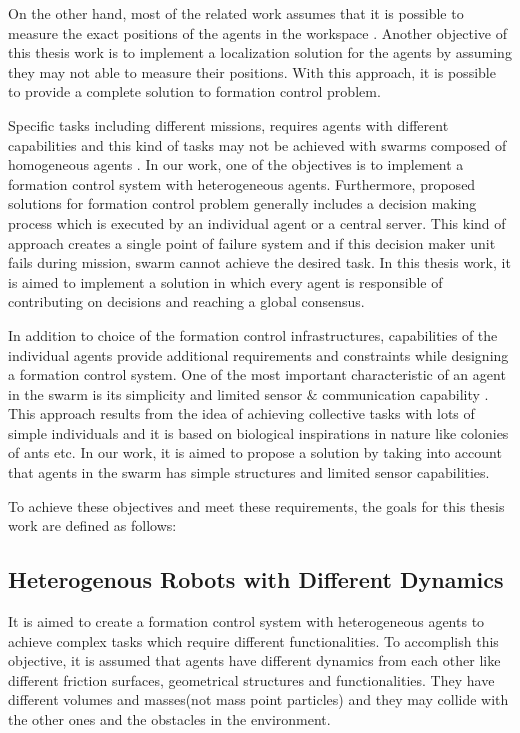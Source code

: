 On the other hand, most of the related work assumes that it is possible to measure the exact positions of the agents in the workspace \cite{98,97}. Another objective of this thesis work is to implement a localization solution for the agents by assuming they may not able to measure their positions. With this approach, it is possible to provide a complete solution to formation control problem.

Specific tasks including different missions, requires agents with different capabilities and this kind of tasks may not be achieved with swarms composed of homogeneous agents \cite{99}. In our work, one of the objectives is to implement a formation control system with heterogeneous agents. Furthermore, proposed solutions for formation control problem generally includes a decision making process which is executed by an individual agent or a central server. This kind of approach creates a single point of failure system and if this decision maker unit fails during mission, swarm cannot achieve the desired task. In this thesis work, it is aimed to implement a solution in which every agent is responsible of contributing on decisions and reaching a global consensus. 

In addition to choice of the formation control infrastructures, capabilities of the individual agents provide additional requirements and constraints while designing a formation control system. One of the most important characteristic of an agent in the swarm is its simplicity and limited sensor $\&$ communication capability \cite{6}. This approach results from the idea of achieving collective tasks with lots of simple individuals  and it is based on biological inspirations in nature like colonies of ants etc. In our work, it is aimed to propose a solution by taking into account that agents in the swarm has simple structures and limited sensor capabilities.

To achieve these objectives and meet these requirements, the goals for this thesis work are defined as follows:

\subsection{Heterogenous Robots with Different Dynamics}
It is aimed to create a formation control system with heterogeneous agents to achieve complex tasks which require different functionalities. To accomplish this objective, it is assumed that agents have different dynamics from each other like different friction surfaces, geometrical structures and functionalities. They have different volumes and masses(not mass point particles) and they may collide with the other ones and the obstacles in the environment.


